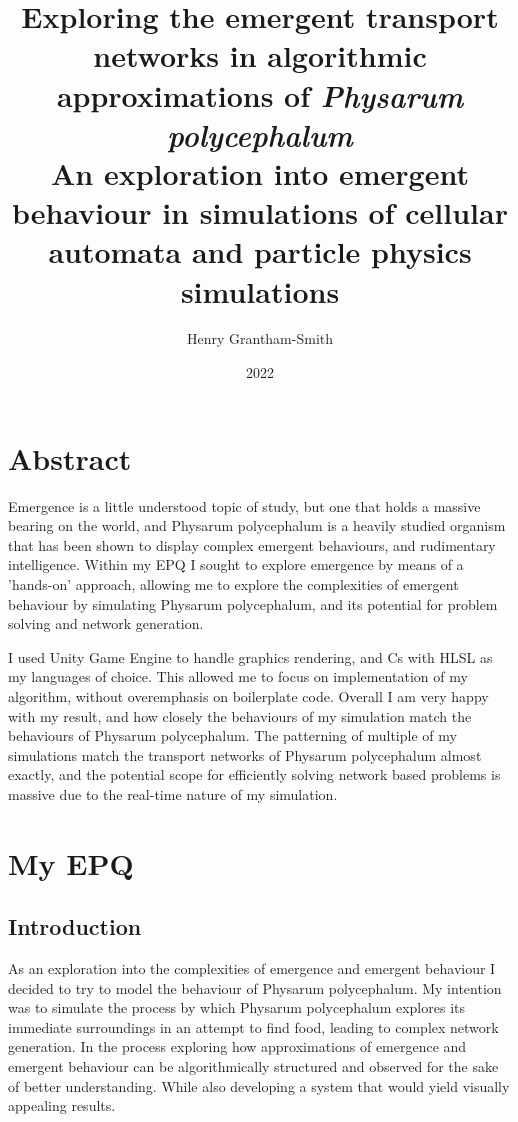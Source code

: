 \documentclass[]{report}
\title{Exploring the emergent transport networks in algorithmic approximations of \textit{Physarum polycephalum}\\
{\large An exploration into emergent behaviour in simulations of cellular automata and particle physics simulations}}
\author{Henry Grantham-Smith}
\date{2022}
\begin{document}
\maketitle

\chapter*{Abstract}
Emergence is a little understood topic of study, but one that holds a massive bearing on the world, and \Gls{Physarum polycephalum} is a heavily studied organism that has been shown to display complex \glspl{emergent behaviour}, and rudimentary intelligence. Within my EPQ I sought to explore emergence by means of a 'hands-on' approach, allowing me to explore the complexities of \gls{emergent behaviour} by simulating \Gls{Physarum polycephalum}, and its potential for problem solving and network generation.

I used Unity Game Engine to handle graphics rendering, and \Gls{Cs} with \Gls{HLSL} as my languages of choice. This allowed me to focus on implementation of my algorithm, without overemphasis on \gls{boilerplate code}. Overall I am very happy with my result, and how closely the behaviours of my simulation match the behaviours of \Gls{Physarum polycephalum}. The patterning of multiple of my simulations match the transport networks of \Gls{Physarum polycephalum} almost exactly, and the potential scope for efficiently solving network based problems is massive due to the real-time nature of my simulation.

\tableofcontents

\printglossary
{}

\chapter{My EPQ}

\section{Introduction}
As an exploration into the complexities of emergence and emergent behaviour I decided to try to model the behaviour of \Gls{Physarum polycephalum}. My intention was to simulate the process by which \Gls{Physarum polycephalum} explores its immediate surroundings in an attempt to find food, leading to complex network generation. In the process exploring how approximations of emergence and emergent behaviour can be algorithmically structured and observed for the sake of better understanding. While also developing a system that would yield visually appealing results.
\end{document}
